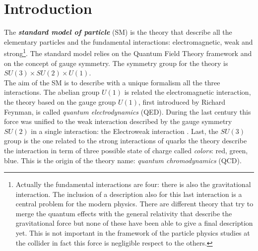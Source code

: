 %
%

\chapter{Introduction}

\setcounter{page}{1}

	The \textbf{\emph{standard model of particle}} (SM) is the theory that describe all the elementary particles and the fundamental interactions: electromagnetic, weak and strong\footnote{Actually the fundamental interactions are four: there is also the gravitational interaction. The inclusion of a description also for this last interaction is a central problem for the modern physics. There are different theory that try to merge the quantum effects with the general relativity that describe the gravitational force but none of these have been able to give a final description yet. This is not important in the framework of the particle physics studies at the collider in fact this force is negligible respect to the others.  }. The standard model relies on the Quantum Field Theory framework and on the concept of gauge symmetry. The symmetry group for the theory is $SU(3)\times SU(2)\times U(1)$. 
\\
The aim of the SM is to describe with a unique formalism all the three interactions. The abelian group $U(1)$ is related the electromagnetic interaction, the theory based on the gauge group $U(1)$, first introduced by Richard Feynman, is called \textit{quantum electrodynamics} (QED). During the last century this force was unified to the weak interaction described by the gauge symmetry $SU(2)$ in a single interaction: the Electroweak interaction \cite{PhysRevLett.19.1264}. Last, the $SU(3)$ group is the one related to the strong interactions of quarks the theory describe the interaction in term of three possible state of charge called \textit{colors}: red, green, blue. This is the origin of the theory name: \textit{quantum chromodynamics} (QCD). 
